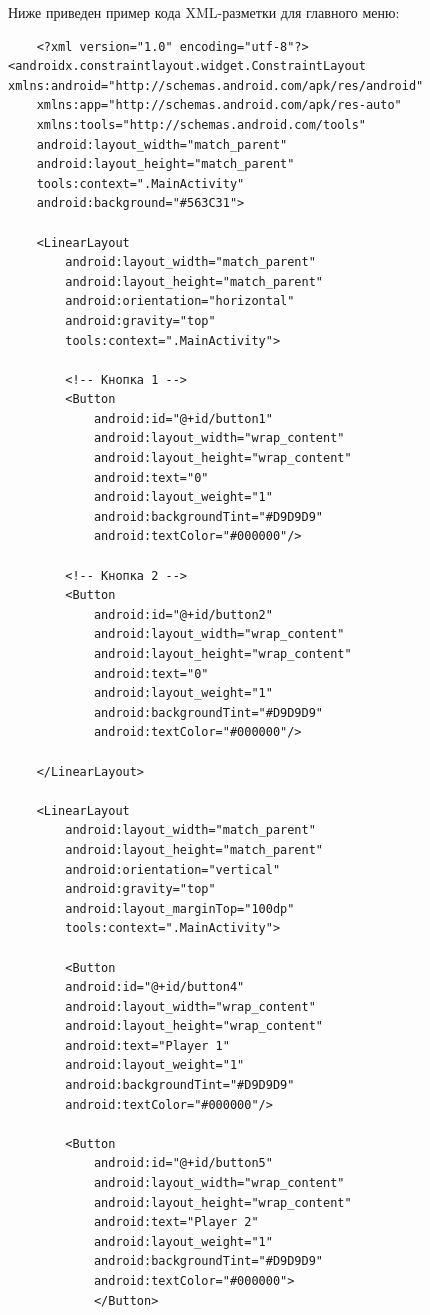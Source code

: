 \documentclass[12pt]{article}
\begin{document}
    Ниже приведен пример кода XML-разметки для главного меню:

    \begin{verbatim}
    <?xml version="1.0" encoding="utf-8"?>
<androidx.constraintlayout.widget.ConstraintLayout xmlns:android="http://schemas.android.com/apk/res/android"
    xmlns:app="http://schemas.android.com/apk/res-auto"
    xmlns:tools="http://schemas.android.com/tools"
    android:layout_width="match_parent"
    android:layout_height="match_parent"
    tools:context=".MainActivity"
    android:background="#563C31">

    <LinearLayout
        android:layout_width="match_parent"
        android:layout_height="match_parent"
        android:orientation="horizontal"
        android:gravity="top"
        tools:context=".MainActivity">

        <!-- Кнопка 1 -->
        <Button
            android:id="@+id/button1"
            android:layout_width="wrap_content"
            android:layout_height="wrap_content"
            android:text="0"
            android:layout_weight="1"
            android:backgroundTint="#D9D9D9"
            android:textColor="#000000"/>

        <!-- Кнопка 2 -->
        <Button
            android:id="@+id/button2"
            android:layout_width="wrap_content"
            android:layout_height="wrap_content"
            android:text="0"
            android:layout_weight="1"
            android:backgroundTint="#D9D9D9"
            android:textColor="#000000"/>

    </LinearLayout>

    <LinearLayout
        android:layout_width="match_parent"
        android:layout_height="match_parent"
        android:orientation="vertical"
        android:gravity="top"
        android:layout_marginTop="100dp"
        tools:context=".MainActivity">

        <Button
        android:id="@+id/button4"
        android:layout_width="wrap_content"
        android:layout_height="wrap_content"
        android:text="Player 1"
        android:layout_weight="1"
        android:backgroundTint="#D9D9D9"
        android:textColor="#000000"/>

        <Button
            android:id="@+id/button5"
            android:layout_width="wrap_content"
            android:layout_height="wrap_content"
            android:text="Player 2"
            android:layout_weight="1"
            android:backgroundTint="#D9D9D9"
            android:textColor="#000000">
            </Button>


\end{verbatim}
\end{document}
